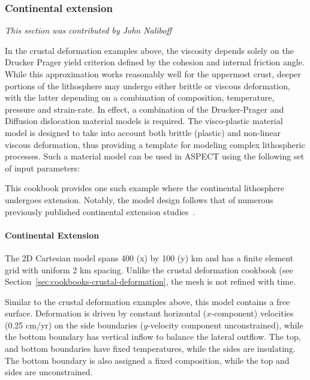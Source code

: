 \documentclass{article}
\newcommand{\aspect}{\textsc{ASPECT}}
\begin{document}
\subsubsection{Continental extension}
\label{sec:cookbooks-continental-extension}
\textit{This section was contributed by John Naliboff}

In the crustal deformation examples above, the viscosity depends solely on the Drucker Prager yield criterion defined by the cohesion and internal friction angle. While this approximation works reasonably well for the uppermost crust, deeper portions of the lithosphere may undergo either brittle or viscous deformation, with the latter depending on a combination of composition, temperature, pressure and strain-rate. In effect, a combination of the Drucker-Prager and Diffusion dislocation material models is required. The visco-plastic material model is designed to take into account both brittle (plastic) and non-linear viscous deformation, thus providing a template for modeling complex lithospheric processes. Such a material model can be used in \aspect{} using the following set of input parameters: 



This cookbook provides one such example where the continental lithosphere undergoes extension. Notably, the model design follows that of numerous previously published continental extension studies~\cite[and references therein]{Hui11,Bru14,Nal15}.

\paragraph{Continental Extension}
The 2D Cartesian model spans 400 (x) by 100 (y) km and has a finite element grid with uniform 2 km spacing. Unlike the crustal deformation cookbook (see Section~\ref{sec:cookbooks-crustal-deformation}, the mesh is not refined with time.




Similar to the crustal deformation examples above, this model contains a free surface. Deformation is driven by constant horizontal ($x$-component) velocities (0.25 cm/yr) on the side boundaries ($y$-velocity component unconstrained), while the bottom boundary has vertical inflow to balance the lateral outflow. The top, and bottom boundaries have fixed temperatures, while the sides are insulating. The bottom boundary is also assigned a fixed composition, while the top and sides are unconstrained.
\end{document}
